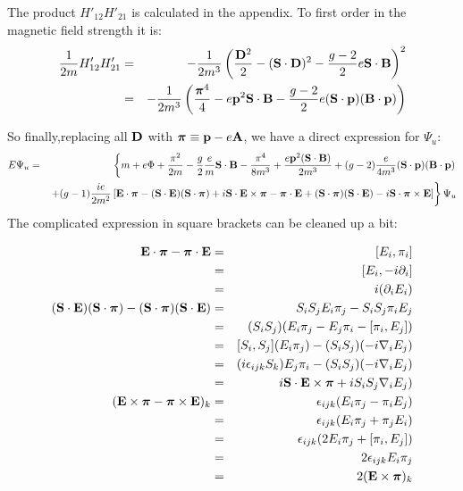 The product $H'_{12}H'_{21}$ is calculated in the appendix.  To first order in the magnetic field strength it is:
\begin{eqnarray*}
\frac{1}{2m}H'_{12}H'_{21}
	&=&	-\frac{1}{2m^3}\left(  \frac {\mathbf{D}^2} {2} -  (\mathbf{S} \cdot \mathbf{D})^2  -  \frac{g-2}{2}  e\mathbf{S} \cdot \mathbf{B} \right )^2	\\	
	&=& 	-\frac{1}{2m^3}\left( 
				\frac{ \mbox{\boldmath$ \pi $}^4 } {4}  -  e \mathbf{p}^2  \mathbf{S} \cdot \mathbf{B}   
				-\frac{g-2}{2}e (\mathbf{S} \cdot \mathbf{p}) (\mathbf{B} \cdot \mathbf{p})
			\right)
\end{eqnarray*}

So finally,replacing all $\mathbf{D}$ with $\mbox{\boldmath$ \pi $} \equiv  \mathbf{p} - e \mathbf{A}$, we have a direct expression for $\Psi_u$:
\begin{eqnarray*}
	E \Psi_u 
		&=&\left \{ m + e\Phi + \frac{\pi^2}{2m} - \frac{g}{2}\frac{e}{m} \mathbf{S} \cdot \mathbf{B}
			- \frac{\pi^4 } {8m^3}  
			+ \frac{ e \mathbf{p}^2  (\mathbf{S} \cdot \mathbf{B}) }{2m^3}
			+ (g-2)\frac{e}{4m^3} (\mathbf{S} \cdot \mathbf{p}) (\mathbf{B} \cdot \mathbf{p})
				 \right .	\\
		&&	\left . 
			+ (g-1)\frac{ie}{2m^2}  \left [ 
					\mathbf{E} \cdot \mbox{\boldmath$ \pi $} - (\mathbf{S} \cdot \mathbf{E}) (\mathbf{S} \cdot \mbox{\boldmath$ \pi $}) + i \mathbf{S} \cdot \mathbf{E} \times \mbox{\boldmath$ \pi $}
					- \mbox{\boldmath$ \pi $} \cdot \mathbf{E} + (\mathbf{S} \cdot \mbox{\boldmath$ \pi $}) (\mathbf{S} \cdot \mathbf{E}) - i \mathbf{S} \cdot \mbox{\boldmath$ \pi $} \times \mathbf{E} 
			\right ]			
			\right \}\Psi_u
\end{eqnarray*}
The complicated expression in square brackets can be cleaned up a bit:

\begin{eqnarray*}
\mathbf{E} \cdot \mbox{\boldmath$ \pi $} - \mbox{\boldmath$ \pi $} \cdot \mathbf{E}
	&=&	[E_i, \pi_i]			\\
	&=&	[E_i, -i\partial_i]	\\
	&=&	i(\partial_i E_i)		\\
(\mathbf{S} \cdot \mathbf{E}) (\mathbf{S} \cdot \mbox{\boldmath$ \pi $}) - (\mathbf{S} \cdot \mbox{\boldmath$ \pi $}) (\mathbf{S} \cdot \mathbf{E})
	&=&	S_i S_j E_i \pi_j - S_i S_j \pi_i E_j						\\
	&=&	(S_i S_j) (E_i \pi_j - E_j \pi_i - [\pi_i, E_j])					\\
	&=&	[S_i, S_j](E_i \pi_j) - (S_i S_j)(-i \nabla_i E_j)				\\
	&=&	(i\epsilon_{ijk}S_k)E_j \pi_i -  (S_i S_j)(-i \nabla_i E_j)		\\
	&=&	i \mathbf{S} \cdot \mathbf{E} \times \mbox{\boldmath$ \pi $} + i S_i S_j \nabla_i E_j)	\\
(\mathbf{E} \times \mbox{\boldmath$ \pi $} - \mbox{\boldmath$ \pi $} \times \mathbf{E})_k
	&=&	\epsilon_{ijk}(E_i \pi_j - \pi_i E_j)		\\
	&=&	\epsilon_{ijk}(E_i \pi_j + \pi_j E_i)		\\
	&=&	\epsilon_{ijk}(2 E_i \pi_j + [\pi_i, E_j])	\\
	&=&	2 \epsilon_{ijk} E_i \pi_j				\\
	&=&	2 (\mathbf{E} \times \mbox{\boldmath$ \pi $})_k
\end{eqnarray*}

